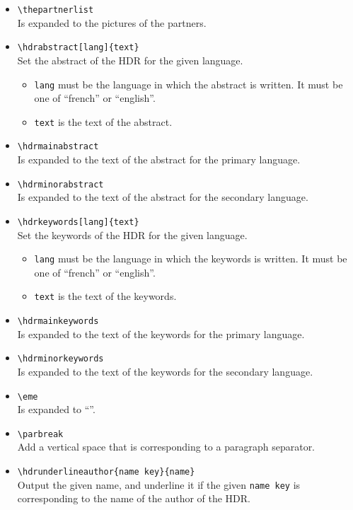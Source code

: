 \documentclass[english]{spimufchdr}
\begin{document}
\begin{itemize}
\item \texttt{{\textbackslash}thepartnerlist} \\
	Is expanded to the pictures of the partners.
\item \texttt{{\textbackslash}hdrabstract[lang]\{text\}} \\
	Set the abstract of the HDR for the given language.
	\begin{itemize}
	\item \texttt{lang} must be the language in which the abstract is written. It must be one of ``french'' or ``english''.
	\item \texttt{text} is the text of the abstract.
	\end{itemize}
\item \texttt{{\textbackslash}hdrmainabstract} \\
	Is expanded to the text of the abstract for the primary language.
\item \texttt{{\textbackslash}hdrminorabstract} \\
	Is expanded to the text of the abstract for the secondary language.
\item \texttt{{\textbackslash}hdrkeywords[lang]\{text\}} \\
	Set the keywords of the HDR for the given language.
	\begin{itemize}
	\item \texttt{lang} must be the language in which the keywords is written. It must be one of ``french'' or ``english''.
	\item \texttt{text} is the text of the keywords.
	\end{itemize}
\item \texttt{{\textbackslash}hdrmainkeywords} \\
	Is expanded to the text of the keywords for the primary language.
\item \texttt{{\textbackslash}hdrminorkeywords} \\
	Is expanded to the text of the keywords for the secondary language.
\item \texttt{{\textbackslash}eme} \\
	Is expanded to ``\eme''.
\item \texttt{{\textbackslash}parbreak} \\
	Add a vertical space that is corresponding to a paragraph separator.
\item \texttt{{\textbackslash}hdrunderlineauthor\{name key\}\{name\}} \\
	Output the given name, and underline it if the given \texttt{name key} is corresponding to the name of the author of the HDR.

\end{itemize}
\end{document}
